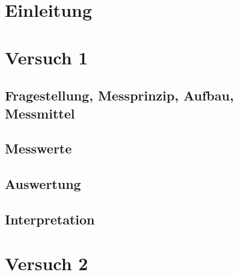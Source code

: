 \documentclass[12pt, oneside, a4paper, \docLanguage]{report}
\begin{document}

\setcounter{section}{0}



\clearpage

%
%


%
%


%
%


%
%




\setcounter{page}{1} 
\pagestyle{default}
%
%
\chapter{Einleitung}
\label{chap:EINL}

\cite{Franz2016n}
\cite{Franz2016e}

%
%
\chapter{Versuch 1}
\label{chap:VERSUCH_1}

\section{Fragestellung, Messprinzip, Aufbau, Messmittel}
\label{chap:VERSUCH_1_FRAGESTELLUNG}

\section{Messwerte}
\label{chap:VERSUCH_1_MESSWERTE}

\section{Auswertung}
\label{chap:VERSUCH_1_AUSWERTUNG}

\section{Interpretation}
\label{chap:VERSUCH_1_INTERPRETATION}

%
%
\chapter{Versuch 2}
\label{chap:VERSUCH_2}
\end{document}
